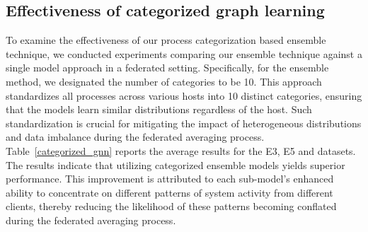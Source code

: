 \subsection{Effectiveness of categorized graph learning}

To examine the effectiveness of our process categorization based \gnnshort ensemble technique, we conducted experiments comparing our ensemble technique against a single model approach in a federated setting. Specifically, for the ensemble method, we designated the number of categories to be 10. This approach standardizes all processes across various hosts into 10 distinct categories, ensuring that the \gnnshort models learn similar distributions regardless of the host. Such standardization is crucial for mitigating the impact of heterogeneous distributions and data imbalance during the federated averaging process. Table~\ref{categorized_gnn} reports the average results for the \darpa E3, E5 and \optc datasets. The results indicate that utilizing categorized ensemble models yields superior performance. This improvement is attributed to each sub-model's enhanced ability to concentrate on different patterns of system activity from different clients, thereby reducing the likelihood of these patterns becoming conflated during the federated averaging process. %


